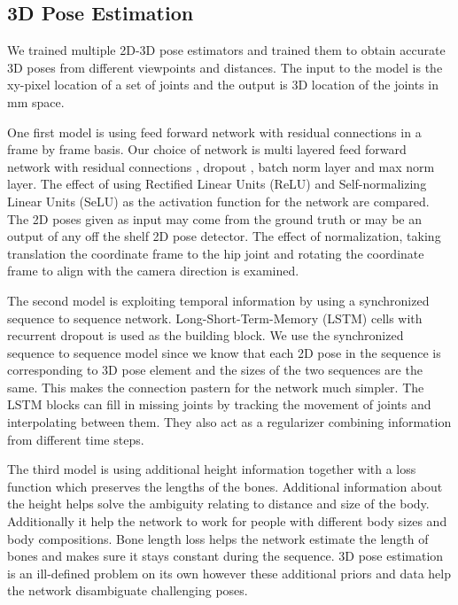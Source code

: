 \subsection{3D Pose Estimation}

We trained multiple 2D-3D pose estimators and trained them to obtain accurate 3D poses from different viewpoints and distances. The input to the model is the xy-pixel location of a set of joints and the output is 3D location of the joints in mm space.

One first model is using feed forward network with residual connections in a frame by frame basis. Our choice of network is multi layered feed forward network with residual connections \parencite{he2016deep}, dropout \parencite{srivastava2014dropout}, batch norm layer \parencite{ioffe2015batch} and max norm layer. The effect of using Rectified Linear Units (ReLU) \parencite{nair2010rectified} and Self-normalizing Linear Units (SeLU) \parencite{klambauer2017self} as the activation function for the network are compared. The 2D poses given as input may come from the ground truth or may be an output of any off the shelf 2D pose detector. The effect of normalization, taking translation the coordinate frame to the hip joint and rotating the coordinate frame to align with the camera direction is examined. 

The second model is exploiting temporal information by using a synchronized sequence to sequence network. Long-Short-Term-Memory (LSTM) \parencite{hochreiter1997long} cells with recurrent dropout \parencite{semeniuta2016recurrent} is used as the building block. We use the synchronized sequence to sequence model since we know that each 2D pose in the sequence is corresponding to 3D pose element and the sizes of the two sequences are the same. This makes the connection pastern for the network much simpler. The LSTM blocks can fill in missing joints by tracking the movement of joints and interpolating between them. They also act as a regularizer combining information from different time steps.  

The third model is using additional height information together with a loss function which preserves the lengths of the bones. Additional information about the height helps solve the ambiguity relating to distance and size of the body. Additionally it help the network to work for people with different body sizes and body compositions. Bone length loss helps the network estimate the length of bones and makes sure it stays constant during the sequence. 3D pose estimation is an ill-defined problem on its own however these additional priors and data help the network disambiguate challenging poses.

